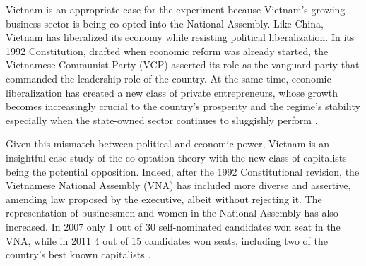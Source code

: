 Vietnam is an appropriate case for the experiment because Vietnam's growing business sector is being co-opted into the National Assembly. Like China, Vietnam has liberalized its economy while resisting political liberalization. In its 1992 Constitution, drafted when economic reform was already started, the Vietnamese Communist Party (VCP) asserted its role as the vanguard party that commanded the leadership role of the country. At the same time, economic liberalization has created a new class of private entrepreneurs, whose growth becomes increasingly crucial to the country's prosperity and the regime's stability especially when the state-owned sector continues to sluggishly perform \citep{Avery1993}.

Given this mismatch between political and economic power, Vietnam is an insightful case study of the co-optation theory with the new class of capitalists being the potential opposition. Indeed, after the 1992 Constitutional revision, the Vietnamese National Assembly (VNA) has included more diverse and assertive, amending law proposed by the executive, albeit without rejecting it. The representation of businessmen and women in the National Assembly has also increased. In 2007 only 1 out of 30 self-nominated candidates won seat in the VNA, while in 2011 4 out of 15 candidates won seats, including two of the country's best known capitalists \citep{Ruwitch2011}.


